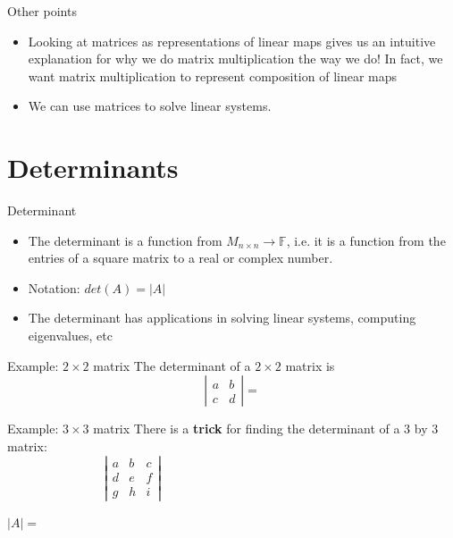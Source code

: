 \documentclass [aspectratio=169]{beamer}
\newcommand{\F}{{\mathbb{F}}}
\begin{document}
\begin{frame}{Other points}
\begin{itemize}
\item Looking at matrices as representations of linear maps gives us an intuitive explanation for why we do matrix multiplication the way we do! In fact, we want matrix multiplication to represent composition of linear maps
\item We can use matrices to solve linear systems.
\end{itemize}
\end{frame}

\section{Determinants}

\begin{frame}{Determinant}
    \begin{itemize}
      \setlength\itemsep{0.5em}
    	\item The determinant is a function from $M_{n \times n} \to \F$, i.e. it is a function from the entries of a square matrix to a real or complex number.
	\item Notation: $det(A) = |A|$
	\item The determinant has applications in solving linear systems, computing eigenvalues, etc
    \end{itemize}

\end{frame}


\begin{frame}{Example: $2\times 2$ matrix}
The determinant of a $2 \times 2$ matrix is 
$$\left| \begin{matrix} a & b \\ c & d \end{matrix} \right| = $$
\end{frame}


\begin{frame}{Example: $3\times 3$ matrix}
There is a \textbf{\textcolor{deptoran}{trick}} for finding the determinant of a 3 by 3 matrix:
$$\left| \begin{matrix} a & b &c \\ d & e & f \\ g & h &i \end{matrix} \right| \qquad \qquad  \qquad \qquad \qquad \qquad \qquad \qquad$$
\vspace{1cm}

$|A| = $
\end{frame}
\end{document}
